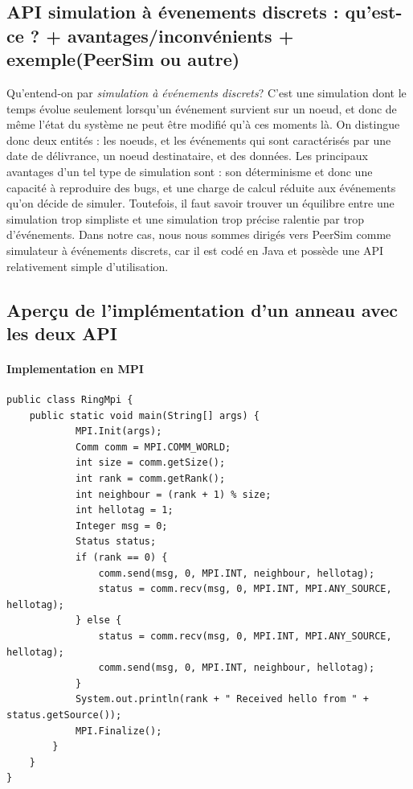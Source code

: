 \documentclass{article}
\begin{document}
			\subsection{API simulation à évenements discrets : qu'est-ce ? + avantages/inconvénients + exemple(PeerSim ou autre)}
				\large{Qu'entend-on par \textit{simulation à événements discrets}? C'est une simulation dont le temps évolue seulement lorsqu'un événement survient sur un noeud, et donc de même l'état du système ne peut être modifié qu'à ces moments là.
\newline \indent On distingue donc deux entités : les noeuds, et les événements qui sont caractérisés par une date de délivrance, un noeud destinataire, et des données.
\newline \indent Les principaux avantages d'un tel type de simulation sont : son déterminisme et donc une capacité à reproduire des bugs, et une charge de calcul réduite aux événements qu'on décide de simuler. Toutefois, il faut savoir trouver un équilibre entre une simulation trop simpliste et une simulation trop précise ralentie par trop d'événements.
\newline \indent Dans notre cas, nous nous sommes dirigés vers PeerSim comme simulateur à événements discrets, car il est codé en Java et possède une API relativement simple d'utilisation. }
			\newpage
			\subsection{Aperçu de l'implémentation d'un anneau avec les deux API}
				\paragraph{Implementation en MPI}
				\begin{lstlisting}
public class RingMpi {
	public static void main(String[] args) {
			MPI.Init(args);
			Comm comm = MPI.COMM_WORLD;
			int size = comm.getSize();
			int rank = comm.getRank();
			int neighbour = (rank + 1) % size;
			int hellotag = 1;
			Integer msg = 0;
			Status status;
			if (rank == 0) {
				comm.send(msg, 0, MPI.INT, neighbour, hellotag);
				status = comm.recv(msg, 0, MPI.INT, MPI.ANY_SOURCE, hellotag);
			} else {
				status = comm.recv(msg, 0, MPI.INT, MPI.ANY_SOURCE, hellotag);
				comm.send(msg, 0, MPI.INT, neighbour, hellotag);
			}
			System.out.println(rank + " Received hello from " + status.getSource());
			MPI.Finalize();
		}
	}
}
				\end{lstlisting}
\end{document}
